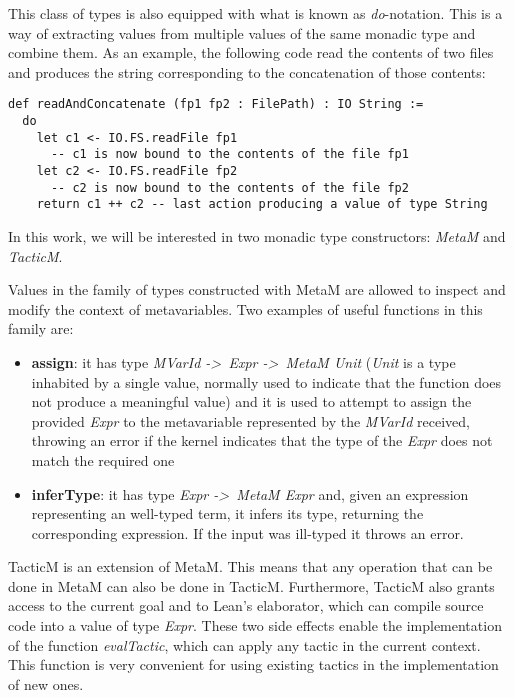 This class of types is also equipped with what is known as \textit{do}-notation. This is a way of extracting values from multiple values of the same monadic type and combine them. As an example, the following code read the contents of two files and produces the string corresponding to the concatenation of those contents:

\begin{verbatim}
def readAndConcatenate (fp1 fp2 : FilePath) : IO String :=
  do
    let c1 <- IO.FS.readFile fp1
      -- c1 is now bound to the contents of the file fp1
    let c2 <- IO.FS.readFile fp2
      -- c2 is now bound to the contents of the file fp2
    return c1 ++ c2 -- last action producing a value of type String
\end{verbatim}

In this work, we will be interested in two monadic type constructors: \textit{MetaM} and \textit{TacticM}.

Values in the family of types constructed with MetaM are allowed to inspect and modify the context of metavariables. Two examples of useful functions in this family are:

\begin{itemize}
  \item \textbf{assign}: it has type \textit{MVarId -\textgreater\ Expr -\textgreater\ MetaM Unit} (\textit{Unit} is a type inhabited by a single value, normally used to indicate that the function does not produce a meaningful value) and it is used to attempt to assign the provided \textit{Expr} to the metavariable represented by the \textit{MVarId} received, throwing an error if the kernel indicates that the type of the \textit{Expr} does not match the required one
  \item \textbf{inferType}: it has type \textit{Expr -\textgreater\ MetaM Expr} and, given an expression representing an well-typed term, it infers its type, returning the corresponding expression. If the input was ill-typed it throws an error.
\end{itemize}

TacticM is an extension of MetaM. This means that any operation that can be done in MetaM can also be done in TacticM. Furthermore, TacticM also grants access to the current goal and to Lean's elaborator, which can compile source code into a value of type \textit{Expr}. These two side effects enable the implementation of the function \textit{evalTactic}, which can apply any tactic in the current context. This function is very convenient for using existing tactics in the implementation of new ones.

